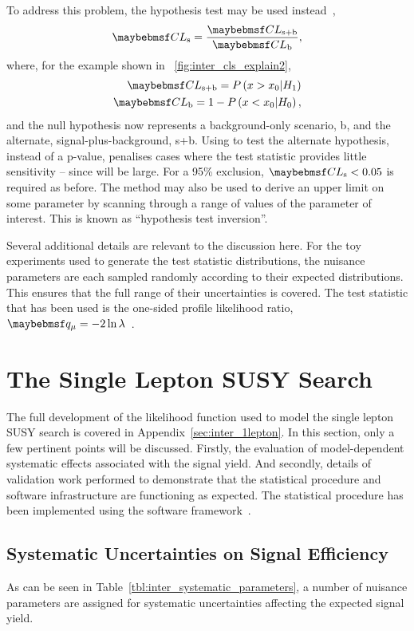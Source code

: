 To address this problem, the \CLs hypothesis test may be used instead~\cite{cls,confidence_level},
\begin{equation*}
\CLs = \frac{\CLspb}{\CLb},
\end{equation*}
where, for the example shown in \fig~\ref{fig:inter_cls_explain2},
\begin{eqnarray*}
\CLspb = P\left(x > x_0 | H_1\right)\\
\CLb = 1 - P\left(x < x_0 | H_0\right),
\end{eqnarray*}
and the null hypothesis now represents a background-only scenario, b, and the
alternate, signal-plus-background, s+b. Using \CLs to test the alternate
hypothesis, instead of a p-value, penalises cases where the test statistic
provides little sensitivity -- since \CLb will be large. For a 95\% exclusion,
$\CLs < 0.05$ is required as before. The \CLs method may also be used to derive
an upper limit on some parameter by scanning through a range of values of the
parameter of interest. This is known as ``hypothesis test inversion''.

Several additional details are relevant to the discussion here. For the toy
experiments used to generate the test statistic distributions, the nuisance
parameters are each sampled randomly according to their expected
distributions. This ensures that the full range of their uncertainties is
covered. The test statistic that has been used is the one-sided profile
likelihood ratio,
$\qmu=-2\ln\lambda$~\cite{cl_computation,modified_frequentist,atlas_cms_higgs,cl_asymptotic}.

\section{The Single Lepton \ac{SUSY} Search}
The full development of the likelihood function used to model the single lepton
\ac{SUSY} search is covered in Appendix~\ref{sec:inter_1lepton}. In this
section, only a few pertinent points will be discussed. Firstly, the evaluation
of model-dependent systematic effects associated with the signal yield. And
secondly, details of validation work performed to demonstrate that the
statistical procedure and software infrastructure are functioning as
expected. The statistical procedure has been implemented using the \roostats
software framework~\cite{roostats,roostats_web}.

\subsection{Systematic Uncertainties on Signal Efficiency}
As can be seen in Table~\ref{tbl:inter_systematic_parameters}, a number of
nuisance parameters are assigned for systematic uncertainties affecting the
expected signal yield.

